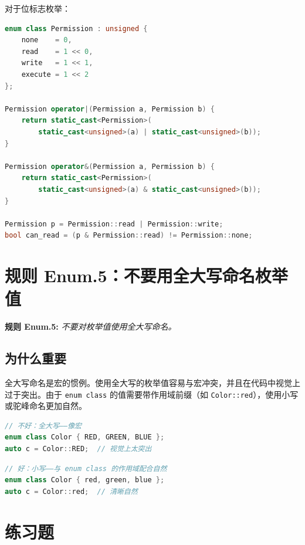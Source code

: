 对于位标志枚举：

\begin{lstlisting}[language=C++]
enum class Permission : unsigned {
    none    = 0,
    read    = 1 << 0,
    write   = 1 << 1,
    execute = 1 << 2
};

Permission operator|(Permission a, Permission b) {
    return static_cast<Permission>(
        static_cast<unsigned>(a) | static_cast<unsigned>(b));
}

Permission operator&(Permission a, Permission b) {
    return static_cast<Permission>(
        static_cast<unsigned>(a) & static_cast<unsigned>(b));
}

Permission p = Permission::read | Permission::write;
bool can_read = (p & Permission::read) != Permission::none;
\end{lstlisting}

\section{规则 Enum.5：不要用全大写命名枚举值}

\textbf{规则 Enum.5:} \textit{不要对枚举值使用全大写命名。}

\subsection{为什么重要}

全大写命名是宏的惯例。使用全大写的枚举值容易与宏冲突，并且在代码中视觉上过于突出。由于 \texttt{enum class} 的值需要带作用域前缀（如 \texttt{Color::red}），使用小写或驼峰命名更加自然。

\begin{lstlisting}[language=C++]
// 不好：全大写——像宏
enum class Color { RED, GREEN, BLUE };
auto c = Color::RED;  // 视觉上太突出
\end{lstlisting}

\begin{lstlisting}[language=C++]
// 好：小写——与 enum class 的作用域配合自然
enum class Color { red, green, blue };
auto c = Color::red;  // 清晰自然
\end{lstlisting}

\section*{练习题}

